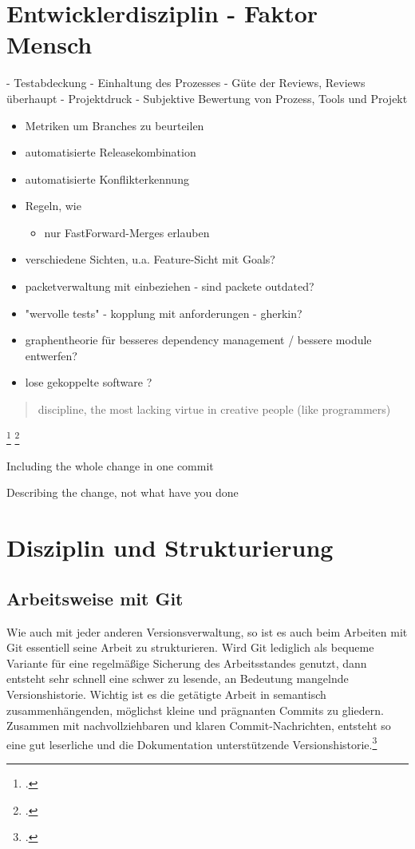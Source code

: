 \section{Entwicklerdisziplin - Faktor Mensch}
\label{sec:human-fail}
- Testabdeckung
- Einhaltung des Prozesses
- Güte der Reviews, Reviews überhaupt
- Projektdruck
- Subjektive Bewertung von Prozess, Tools und Projekt

\begin{itemize}
\item Metriken um Branches zu beurteilen
\item automatisierte Releasekombination
\item automatisierte Konflikterkennung
\item Regeln, wie 
	\begin{itemize}
		\item nur FastForward-Merges erlauben
	\end{itemize}	 
\item verschiedene Sichten, u.a. Feature-Sicht mit Goals?
\item packetverwaltung mit einbeziehen - sind packete outdated?
\item "wervolle tests" - kopplung mit anforderungen - gherkin?
\item graphentheorie für besseres dependency management / bessere module entwerfen?
\item lose gekoppelte software ?
\end{itemize}

\blockquote {discipline, the most lacking virtue in creative people (like programmers)}
\footcite[Making only one change per commit][]{git-essentials-2017}
\footcite[Writing commit messages before starting to code][]{git-essentials-2017}

Including the whole change in one commit

Describing the change, not what have you done



\section{Disziplin und Strukturierung}
\subsection{Arbeitsweise mit Git}

Wie auch mit jeder anderen Versionsverwaltung, so ist es auch beim Arbeiten mit Git essentiell seine Arbeit zu strukturieren. Wird Git lediglich als bequeme Variante für eine regelmäßige Sicherung des Arbeitsstandes genutzt, dann entsteht sehr schnell eine schwer zu lesende, an Bedeutung mangelnde Versionshistorie. Wichtig ist es die getätigte Arbeit in semantisch zusammenhängenden, möglichst kleine und prägnanten Commits zu gliedern.
Zusammen mit nachvollziehbaren und klaren Commit-Nachrichten, entsteht so eine gut leserliche und die Dokumentation unterstützende Versionshistorie.\footcite[Making only one change per commit][]{git-essentials-2017}
